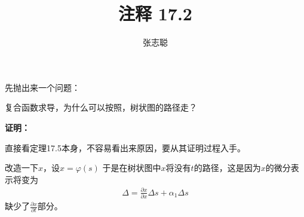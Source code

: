 \documentclass{article}
\begin{document}
\title{注释 17.2}
\author{张志聪}
\maketitle

\begin{zremark}
  先抛出来一个问题：

  复合函数求导，为什么可以按照，树状图的路径走？
\end{zremark}
\textbf{证明：}

直接看定理17.5本身，不容易看出来原因，要从其证明过程入手。

改造一下$x$，设$x = \varphi(s)$
于是在树状图中$x$将没有$t$的路径，这是因为$x$的微分表示将变为
\begin{align}
  \Delta = \frac{\partial x}{\partial x} \Delta s + \alpha_1 \Delta s
\end{align}
缺少了$\frac{\partial x}{\partial t}$部分。
\end{document}
